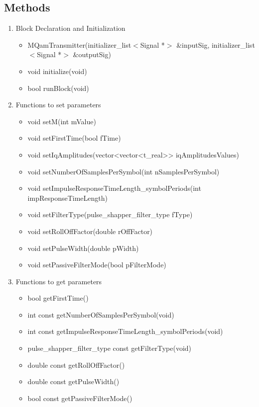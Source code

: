 \subsection*{Methods}
\begin{enumerate}
\item Block Declaration and Initialization
             \begin{itemize}
                 \item MQamTransmitter(initializer\_list$<$Signal *$>$ \&inputSig, initializer\_list$<$Signal *$>$ \&outputSig)
                 \item void initialize(void)
	             \item bool runBlock(void)
             \end{itemize}
\item Functions to set parameters
             \begin{itemize}
                \item void setM(int mValue)
                \item void setFirstTime(bool fTime)
                \item void setIqAmplitudes(vector<vector<t\_real>> iqAmplitudesValues)
                \item void setNumberOfSamplesPerSymbol(int nSamplesPerSymbol)
                \item void setImpulseResponseTimeLength\_symbolPeriods(int impResponseTimeLength)
                \item void setFilterType(pulse\_shapper\_filter\_type fType)
                \item void setRollOffFactor(double rOffFactor)
                \item void setPulseWidth(double pWidth)
                \item void setPassiveFilterMode(bool pFilterMode)
             \end{itemize}
\item Functions to get parameters
             \begin{itemize}
                \item bool getFirstTime()
                \item int const getNumberOfSamplesPerSymbol(void)
                \item int const getImpulseResponseTimeLength\_symbolPeriods(void)
                \item pulse\_shapper\_filter\_type const getFilterType(void)
                \item double const getRollOffFactor()
                \item double const getPulseWidth()
                \item bool const getPassiveFilterMode()
             \end{itemize}
\end{enumerate}


